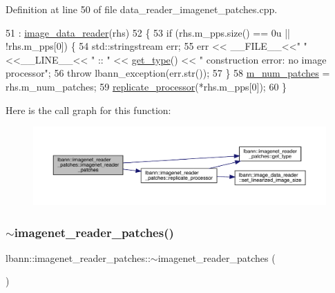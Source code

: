 Definition at line 50 of file data\+\_\+reader\+\_\+imagenet\+\_\+patches.\+cpp.


\begin{DoxyCode}
51   : \hyperlink{classlbann_1_1image__data__reader_a582185ab03c4643117fd93e0ba843882}{image\_data\_reader}(rhs)
52 \{
53   \textcolor{keywordflow}{if} (rhs.m\_pps.size() == 0u || !rhs.m\_pps[0]) \{
54     std::stringstream err;
55     err << \_\_FILE\_\_<<\textcolor{stringliteral}{" "}<<\_\_LINE\_\_<< \textcolor{stringliteral}{" :: "} << \hyperlink{classlbann_1_1imagenet__reader__patches_adc6363b20f058260c674d92af2a6ef80}{get\_type}() << \textcolor{stringliteral}{" construction error: no image
       processor"};
56     \textcolor{keywordflow}{throw} lbann\_exception(err.str());
57   \}
58   \hyperlink{classlbann_1_1imagenet__reader__patches_a3380936d3d01d5efc77f0f129891fc65}{m\_num\_patches} = rhs.m\_num\_patches;
59   \hyperlink{classlbann_1_1imagenet__reader__patches_a714247cc547161688a66a64737527de0}{replicate\_processor}(*rhs.m\_pps[0]);
60 \}
\end{DoxyCode}
Here is the call graph for this function\+:\nopagebreak
\begin{figure}[H]
\begin{center}
\leavevmode
\includegraphics[width=350pt]{classlbann_1_1imagenet__reader__patches_aca10e740934921c5c0399aae6e873a88_cgraph}
\end{center}
\end{figure}
\mbox{\label{classlbann_1_1imagenet__reader__patches_a4762a284ef646f6de1a0e0a7ac33d4ad}} 
\subsubsection{\texorpdfstring{$\sim$imagenet\+\_\+reader\+\_\+patches()}{~imagenet\_reader\_patches()}}
{\footnotesize\ttfamily lbann\+::imagenet\+\_\+reader\+\_\+patches\+::$\sim$imagenet\+\_\+reader\+\_\+patches (\begin{DoxyParamCaption}{ }\end{DoxyParamCaption})\hspace{0.3cm}{\ttfamily [override]}}



